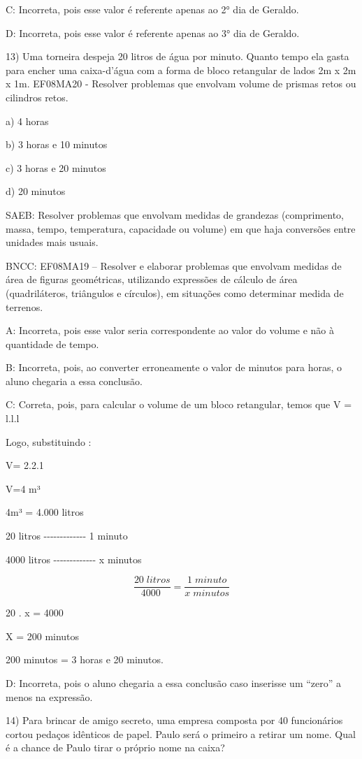 C: Incorreta, pois esse valor é referente apenas ao 2° dia de Geraldo.

D: Incorreta, pois esse valor é referente apenas ao 3° dia de Geraldo.

13) Uma torneira despeja 20 litros de água por minuto. Quanto tempo ela
gasta para encher uma caixa-d'água com a forma de bloco retangular de
lados 2m x 2m x 1m. EF08MA20 - Resolver problemas que envolvam volume de
prismas retos ou cilindros retos.

a) 4 horas

b) 3 horas e 10 minutos

c) 3 horas e 20 minutos

d) 20 minutos

SAEB: Resolver problemas que envolvam medidas de grandezas (comprimento,
massa, tempo, temperatura, capacidade ou volume) em que haja conversões
entre unidades mais usuais.

BNCC: EF08MA19 -- Resolver e elaborar problemas que envolvam medidas de
área de figuras geométricas, utilizando expressões de cálculo de área
(quadriláteros, triângulos e círculos), em situações como determinar
medida de terrenos.

A: Incorreta, pois esse valor seria correspondente ao valor do volume e
não à quantidade de tempo.

B: Incorreta, pois, ao converter erroneamente o valor de minutos para
horas, o aluno chegaria a essa conclusão.

C: Correta, pois, para calcular o volume de um bloco retangular, temos
que V = l.l.l

Logo, substituindo :

V= 2.2.1

V=4 m³

4m³ = 4.000 litros

20 litros -\/-\/-\/-\/-\/-\/-\/-\/-\/-\/-\/-\/- 1 minuto

4000 litros -\/-\/-\/-\/-\/-\/-\/-\/-\/-\/-\/-\/- x minutos

\[\frac {20 \; litros}{4000 \;} = \frac {1 \; minuto}{x \; minutos}\]

20 . x = 4000

X = 200 minutos

200 minutos = 3 horas e 20 minutos.

D: Incorreta, pois o aluno chegaria a essa conclusão caso inserisse um
``zero'' a menos na expressão.

14) Para brincar de amigo secreto, uma empresa composta por 40
funcionários cortou pedaços idênticos de papel. Paulo será o primeiro a
retirar um nome. Qual é a chance de Paulo tirar o próprio nome na caixa?

